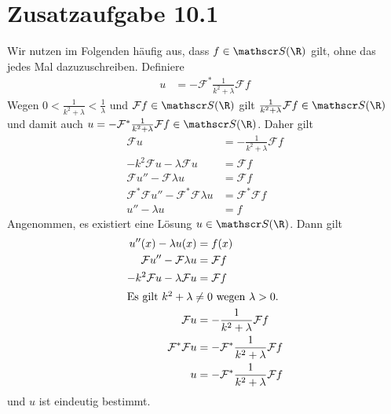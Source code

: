 \documentclass{article}
\begin{document}
    \section*{Zusatzaufgabe 10.1}
    Wir nutzen im Folgenden häufig aus, dass $f \in \mathscr S(\R)$ gilt, ohne das jedes Mal dazuzuschreiben.
    Definiere 
    \begin{align*}
        u &= -\mathcal{F}^* \frac{1}{k^2 + \lambda} \mathcal{F} f
    \end{align*}
    Wegen $0 < \frac{1}{k^2 + \lambda} < \frac{1}{\lambda}$ und $\mathcal{F} f \in \mathscr S(\R)$ gilt 
    $\frac{1}{k^2 + \lambda} \mathcal{F} f \in \mathscr S(\R)$ und damit auch 
    $u = -\mathcal{F}^* \frac{1}{k^2 + \lambda} \mathcal{F} f \in \mathscr S(\R)$.
    Daher gilt
    \begin{align*}
        \mathcal{F} u &= - \frac{1}{k^2 + \lambda} \mathcal{F} f\\
        -k^2 \mathcal{F} u - \lambda \mathcal{F} u &= \mathcal{F} f\\
        \mathcal{F} u'' - \mathcal{F} \lambda u &= \mathcal{F} f\\
        \mathcal{F}^* \mathcal{F} u'' - \mathcal{F}^* \mathcal{F} \lambda u &= \mathcal{F}^* \mathcal{F} f\\
        u'' - \lambda u &= f
    \end{align*}
    Angenommen, es existiert eine Lösung $u \in \mathscr S(\R)$. Dann gilt
    \begin{align*}
        u''(x) - \lambda u(x) &= f(x)\\
        \mathcal{F} u'' - \mathcal{F} \lambda u &= \mathcal{F} f\\
        -k^2 \mathcal{F} u - \lambda \mathcal{F} u &= \mathcal{F} f\\
    \intertext{Es gilt $k^2 + \lambda \neq 0$ wegen $\lambda > 0$.}
        \mathcal{F} u &= -\frac{1}{k^2 + \lambda}\mathcal{F} f\\
        \mathcal{F}^*\mathcal{F} u &= -\mathcal{F}^* \frac{1}{k^2 + \lambda} \mathcal{F} f\\
        u &= -\mathcal{F}^* \frac{1}{k^2 + \lambda} \mathcal{F} f\\
    \end{align*}
    und $u$ ist eindeutig bestimmt.
\end{document}
